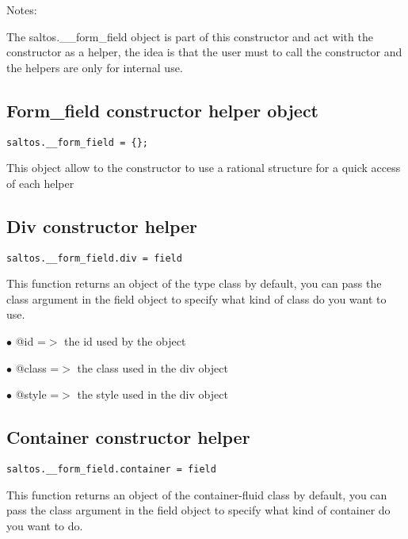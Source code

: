 \documentclass[a4paper]{book}
\begin{document}
Notes:

The saltos.\_\_form\_field object is part of this constructor and act with the constructor
as a helper, the idea is that the user must to call the constructor and the helpers are
only for internal use.

\hypertarget{toc369}{}
\subsection{Form\_field constructor helper object}

\begin{lstlisting}
saltos.__form_field = {};
\end{lstlisting}

This object allow to the constructor to use a rational structure for a quick access of each helper

\hypertarget{toc370}{}
\subsection{Div constructor helper}

\begin{lstlisting}
saltos.__form_field.div = field
\end{lstlisting}

This function returns an object of the type class by default, you can pass the class
argument in the field object to specify what kind of class do you want to use.

\begin{compactitem}
\item[\color{myblue}$\bullet$] @id    =$>$ the id used by the object
\item[\color{myblue}$\bullet$] @class =$>$ the class used in the div object
\item[\color{myblue}$\bullet$] @style =$>$ the style used in the div object
\end{compactitem}

\hypertarget{toc371}{}
\subsection{Container constructor helper}

\begin{lstlisting}
saltos.__form_field.container = field
\end{lstlisting}

This function returns an object of the container-fluid class by default, you can pass the class
argument in the field object to specify what kind of container do you want to do.
\end{document}
